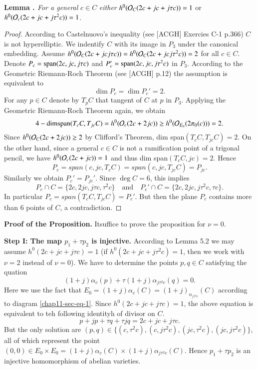 \medskip
\noindent
{\bfseries {} Lemma . \label{chap11-lemma-5.2}} \textit{For a general} $c\in C$ \textit{either} $h^{0}(\mathcal{O}_{C}(2c + jc +j \tau c)) =1$ or $h^{0}(\mathcal{O}_{c}(2c +jc +j\tau^{2}c))=1$.

\begin{proof}
According to Castelnuovo's inequality (see [ACGH] Exercies C-1 p.366) $C$ is not hyperelliptic. We indentify $C$ with its image in $P_{3}$ under the canonical embedding. Assume $h^{0}(\mathcal{O}_{C}(2c +jc j\tau c)) = h^{0}(\mathcal{O}_{C}(2c +jc j\tau^{2} c)) =2$ for all $c \in C$. Denote $P_{c}={\rm span}(2c,jc, j\tau c)$ and $P_{c}'={\rm span}(2c, jc, j\tau^{2}c)$ in $P_{3}$. According to the Geometric Riemann-Roch Theorem (see [ACGH] p.12) the assumption is equivalent to
$$
\dim P_{c} =\dim P_{c}' =2.
$$ 
For any $p \in C$ denote by $T_{p}C$ that tangent of $C$ at $p$ in $P_{3}$. Applying the Geometric Riemann-Roch Theorem again, we obtain
$$
4-{\rm dim span} (T_{c}C, T_{jc}C)=h^{0}(\mathcal{O}_{c}(2c +2jc))\geq h^{0}(\mathcal{O}_{E_{0}}(2\pi_{0}(c)))=2.
$$
Since $h^{0}(\mathcal{O}_{C}(2c +2jc))\geq 2 $ by Clifford's Theorem, dim span$(T_{c}C, T_{jc}C) = 2$. On the other hand, since a general $c\in C$ is not a ramification point of a trigonal pencil, we have $h^{0}(\mathcal{O}_{c}(2c + jc))=1$ and thus dim span$(T_{c}C, jc)=2$. Hence
$$
P_{c} = span(c, jc, T_{c}C)= span(c, jc,T_{jc}C)=P_{jc}.
$$
Similarly we obtain $P_{c}'=P_{jc}'$. Since $\deg C =6$, this implies
$$
P_{c}\cap C= \{2c,2jc, j\tau c, \tau^{2}c\} \quad \text{and} \quad P_{c}'\cap C = \{2c, 2jc,j\tau^{2}c, \tau c\}.
$$
In particular $P_{c}= span (T_{c}C, T_{jc}C)= P_{c}'$. But then the plane $P_{c}$ contains more than 6 points of $C$, a contradiction.
\end{proof}

\eject

\medskip
\noindent
{\bfseries Proof of the Proposition.} It\pageoriginale suffice  to prove the proposition for $\nu =0$.

\medskip
\noindent
{\bfseries Step I: The map $p_{1} + \tau p_{2}$ is injective.} According to Lemma 5.2 we may assume $h^{0}(2c +jc +j \tau c) =1$ (if $h^{0}(2c + jc +j\tau^{2}c)=1$, then we work with $\nu=2$ instead of $\nu =0$). We have to determine the points $p,q\in C$ satisfying the quation
$$
(1 +j)\alpha_{c}(p) + \tau(1+j)\alpha_{j\tau^{2}c}(q)=0.
$$
Here we use the fact that $ E_{0}=(1 +j)\alpha_{c}(C)=(1+j)_{\alpha_{j\tau^{2}c}}(C)$ according to diagram \eqref{chap11-sec-eq-1}. Since $h^{0}(2c +jc +j\tau c)=1$, the above equation is equivalent to teh following identityh of divisor on $C$.
$$
p +jp + \tau q + \tau jq =2c +jc  +j\tau c.
$$
But the only solution are $(p,q) \in \{(c,\tau^{2}c), (c, j\tau^{2}c), (jc,\tau^{2}c),(jc,j\tau^{2}c)\}$, all of which represent the point $(0,0) \in E_{0} \times E_{0} =(1 +j)\alpha_{c}(C)\times (1 +j)\alpha_{j\tau^{2}c}(C)$.
Hence $p_{1} +\tau p_{2}$ is an injective homomorphism of abelian varieties.

